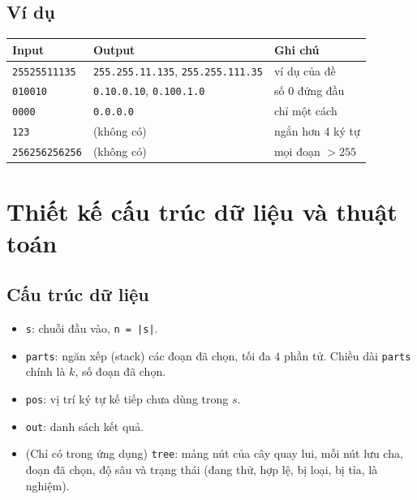 \documentclass[12pt,a4paper]{article}
\begin{document}
\subsection{Ví dụ}
\begin{table}[H]
\centering
\begin{tabular}{@{}lll@{}}
\toprule
\textbf{Input} & \textbf{Output} & \textbf{Ghi chú} \\
\midrule
\texttt{25525511135} & \texttt{255.255.11.135}, \texttt{255.255.111.35} & ví dụ của đề \\
\texttt{010010} & \texttt{0.10.0.10}, \texttt{0.100.1.0} & số $0$ đứng đầu \\
\texttt{0000} & \texttt{0.0.0.0} & chỉ một cách \\
\texttt{123} & (không có) & ngắn hơn 4 ký tự \\
\texttt{256256256256} & (không có) & mọi đoạn $>255$ \\
\bottomrule
\end{tabular}
\end{table}

\section{Thiết kế cấu trúc dữ liệu và thuật toán}\label{sec:algo}

\subsection{Cấu trúc dữ liệu}
\begin{itemize}
    \item \texttt{s}: chuỗi đầu vào, \texttt{n = |s|}.
    \item \texttt{parts}: ngăn xếp (stack) các đoạn đã chọn, tối đa $4$ phần tử. Chiều dài \texttt{parts} chính là $k$, số đoạn đã chọn.
    \item \texttt{pos}: vị trí ký tự kế tiếp chưa dùng trong $s$.
    \item \texttt{out}: danh sách kết quả.
    \item (Chỉ có trong ứng dụng) \texttt{tree}: mảng nút của cây quay lui, mỗi nút lưu cha, đoạn đã chọn, độ sâu và trạng thái (đang thử, hợp lệ, bị loại, bị tỉa, là nghiệm).
\end{itemize}
\end{document}

